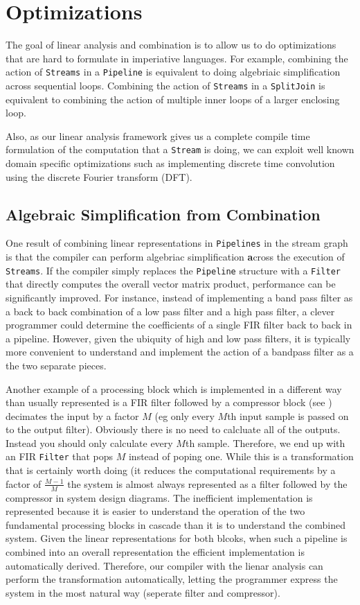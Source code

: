 \section{Optimizations}
The goal of linear analysis and combination is to allow us to do optimizations
that are hard to formulate in imperiative languages. For example, combining the action
of {\tt Streams} in a {\tt Pipeline} is equivalent to doing algebriaic simplification across
sequential loops. Combining the action of {\tt Streams} in a {\tt SplitJoin} is equivalent
to combining the action of multiple inner loops of a larger enclosing loop.

Also, as our linear analysis framework gives us a complete compile time formulation of the 
computation that a {\tt Stream} is doing, we can exploit well known domain specific optimizations
such as implementing discrete time convolution using the discrete Fourier transform (DFT). 
 


\subsection{Algebraic Simplification from Combination}
One result of combining linear representations in {\tt Pipelines} in the stream graph is that  
the compiler can perform algebriac simplification {\textbf across} the execution of {\tt Streams}. 
If the compiler simply replaces the {\tt Pipeline} structure with a {\tt Filter} that 
directly computes the overall vector matrix product, performance can be significantly improved.
For instance, instead of implementing a band pass filter as a back to back combination
of a low pass filter and a high pass filter, a clever programmer could determine the coefficients 
of a single FIR filter back to back in a pipeline. However, given the ubiquity of high and 
low pass filters, it is typically more convenient to understand and implement the action
of a bandpass filter as a the two separate pieces.

Another example of a processing block which is implemented in a different way than
usually represented is a FIR filter followed by a compressor block 
(see \cite{oppenheim-discrete}) decimates the input by a factor $M$ (eg only every $M$th 
input sample is passed on to the output filter). 
Obviously there is no need to calcluate all of the outputs. 
Instead you should only calculate every $M$th sample.
Therefore, we end up with an FIR {\tt Filter} that pops $M$ instead of poping one. While
this is a transformation that is certainly worth doing (it reduces the computational
requirements by a factor of $\frac{M-1}{M}$ the system is almost always represented
as a filter followed by the compressor in system design diagrams. The inefficient
implementation is represented because it is easier to understand the operation of the
two fundamental processing blocks in cascade than it is to understand the combined system.
Given the linear representations for both blcoks, when such a pipeline is combined into an
overall representation the efficient implementation is automatically derived. Therefore,
our compiler with the lienar analysis can perform the transformation automatically, 
letting the programmer express the system in the most natural way (seperate filter and compressor).

